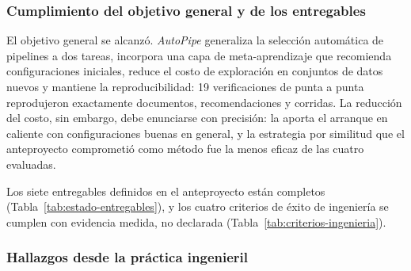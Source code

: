 \documentclass[12pt,letterpaper,oneside]{article}
\begin{document}
\subsubsection{Cumplimiento del objetivo general y de los entregables}

El objetivo general se alcanzó. \textit{AutoPipe} generaliza la selección automática de
pipelines a dos tareas, incorpora una capa de meta-aprendizaje que recomienda
configuraciones iniciales, reduce el costo de exploración en conjuntos de datos nuevos y
mantiene la reproducibilidad: 19 verificaciones de punta a punta reprodujeron exactamente
documentos, recomendaciones y corridas. La reducción del costo, sin embargo, debe
enunciarse con precisión: la aporta el arranque en caliente con configuraciones buenas en
general, y la estrategia por similitud que el anteproyecto comprometió como método fue la
menos eficaz de las cuatro evaluadas.

Los siete entregables definidos en el anteproyecto están completos
(Tabla~\ref{tab:estado-entregables}), y los cuatro criterios de éxito de ingeniería se
cumplen con evidencia medida, no declarada (Tabla~\ref{tab:criterios-ingenieria}).

\subsubsection{Hallazgos desde la práctica ingenieril}
\end{document}
